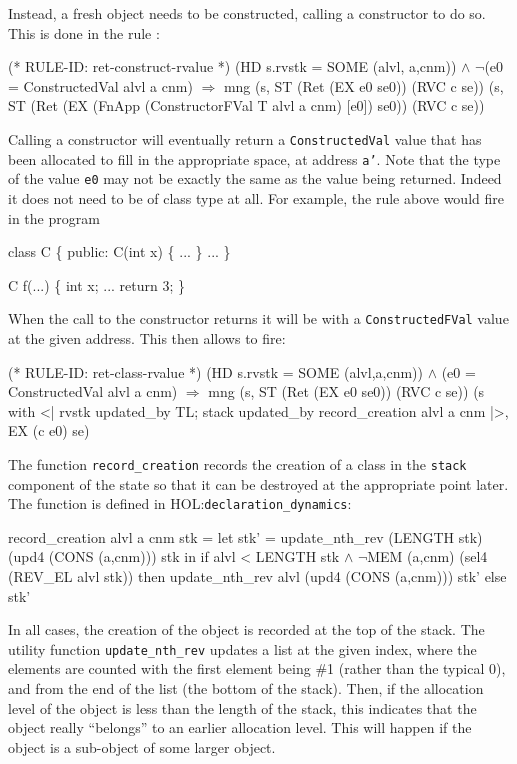 \documentclass[11pt]{article}
\newcommand{\HOLfile}[1]{HOL:\texttt{#1}}
\begin{document}
Instead, a fresh object needs to be constructed, calling a constructor
to do so.  This is done in the rule
:%
\begin{stdrule}
(* RULE-ID: ret-construct-rvalue *)
     (HD s.rvstk = SOME (alvl, a,cnm)) \(\land\)
     \(\neg\)(e0 = ConstructedVal alvl a cnm)
   \(\Rightarrow\)
     mng (s, ST (Ret (EX e0 se0)) (RVC c se))
         (s, ST (Ret (EX (FnApp (ConstructorFVal T alvl a cnm)
                                [e0])
                         se0))
                (RVC c se))
\end{stdrule}
Calling a constructor will eventually return a \texttt{ConstructedVal} value%
%
that has been allocated to fill in the appropriate space, at address
\texttt{a'}.  Note that the type of the value \texttt{e0} may not be
exactly the same as the value being returned.  Indeed it does not need
to be of class type at all.  For example, the rule above would fire in
the program
\begin{stdrule}
   class C \{
   public:
     C(int x) \{ ... \}
     ...
   \}

   C f(...) \{ int x; ... return 3; \}
\end{stdrule}
When the call to the constructor returns it will be with a
\texttt{ConstructedFVal} value at the given address.  This then allows
 to fire: %
%
\begin{stdrule}
(* RULE-ID: ret-class-rvalue *)
     (HD s.rvstk = SOME (alvl,a,cnm)) \(\land\)
     (e0 = ConstructedVal alvl a cnm)
   \(\Rightarrow\)
     mng (s, ST (Ret (EX e0 se0)) (RVC c se))
         (s with <|
            rvstk updated_by TL;
            stack updated_by record_creation alvl a cnm
          |>,
          EX (c e0) se)
\end{stdrule}
The function
\texttt{record_creation}
records the creation of a class in the \texttt{stack} component of the
state so that it can be destroyed at the appropriate point later.  The
function is defined in \HOLfile{declaration_dynamics}:
\begin{stdrule}
  record_creation alvl a cnm stk =
    let stk' = update_nth_rev (LENGTH stk)
                              (upd4 (CONS (a,cnm))) stk
    in
      if alvl < LENGTH stk \(\land\)
         \(\neg\)MEM (a,cnm) (sel4 (REV_EL alvl stk))
      then
        update_nth_rev alvl (upd4 (CONS (a,cnm))) stk'
      else
        stk'
\end{stdrule}
In all cases, the creation of the object is recorded at the top of the
stack.  The utility function \texttt{update_nth_rev} updates a list at
the given index, where the elements are counted with the first element
being \#1 (rather than the typical 0), and from the end of the list
(the bottom of the stack).  Then, if the allocation level of the
object is less than the length of the stack, this indicates that the
object really ``belongs'' to an earlier allocation level.  This will
happen if the object is a sub-object of some larger object.
\end{document}
